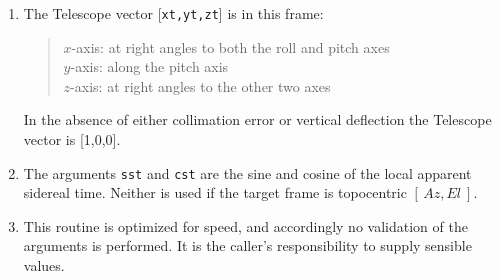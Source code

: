 \documentclass[12pt,fleqn,twoside]{article}
\renewcommand{\_}{{\tt\char'137}}     %
\newcommand{\radec}     {$[\,\alpha,\delta\,]$}
\newcommand{\hadec}     {$[\,h,\delta\,]$}
\newcommand{\azel}      {$[\,Az,El~]$}
\begin{document}
{\begin{enumerate}
\begin{tabbing}
         \> {\tt sst,cst} \> \radec\ $\Leftarrow$ \hadec \\
         \> {\tt spm2\_i} \> geocentric \hadec\ $\Leftarrow$ {\sc Aim}
      \end{tabbing}
      \begin{tabbing}
         xxx \= xxxxxxxxxx \= \kill
         \> {\tt frame  } \> {\tt APPT\_TOPO} \\
         \> {\tt target } \> topocentric apparent \radec \\
         \> {\tt spm1\_i} \> identity matrix \\
         \> {\tt sst,cst} \> \radec\ $\Leftarrow$ \hadec \\
         \> {\tt spm2\_i} \> topocentric \hadec\ $\Leftarrow$ {\sc Aim}
      \end{tabbing}
      \begin{tabbing}
         xxx \= xxxxxxxxxx \= \kill
         \> {\tt frame  } \> {\tt AZEL\_TOPO} \\
         \> {\tt target } \> topocentric \azel\ (N thru E) \\
         \> {\tt spm1\_i} \> identity matrix \\
         \> {\tt sst,cst} \> not used \\
         \> {\tt spm2\_i} \> topocentric \azel\ $\Leftarrow$ {\sc Aim}
      \end{tabbing}

      ICRS $\approx$ FK5 J2000 to better than 25 mas.
\item The {\sc Telescope} vector [{\tt xt,yt,zt}] is in this frame:
      \begin{quote}
      $x$-axis:  at right angles to both the roll and pitch axes \\
      $y$-axis:  along the pitch axis \\
      $z$-axis:  at right angles to the other two axes
      \end{quote}
      In the absence of either collimation error or vertical deflection
      the {\sc Telescope} vector is [1,0,0].
\item The arguments {\tt sst} and {\tt cst} are the sine and
      cosine of the local apparent sidereal time.  Neither is used if
      the target frame is topocentric \azel.
\item This routine is optimized for speed, and accordingly no validation
      of the arguments is performed.  It is the caller's responsibility
      to supply sensible values.
\end{enumerate}
}
\end{document}
